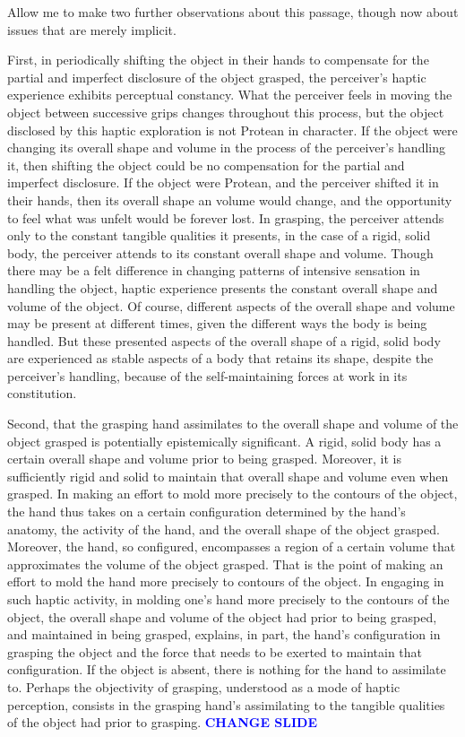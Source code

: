 \documentclass[12pt]{article}
\newcommand{\change}{\textcolor{blue}{\textbf{CHANGE SLIDE}}}
\begin{document}
Allow me to make two further observations about this passage, though now about issues that are merely implicit.

First, in periodically shifting the object in their hands to compensate for the partial and imperfect disclosure of the object grasped, the perceiver's haptic experience exhibits perceptual constancy. What the perceiver feels in moving the object between successive grips changes throughout this process, but the object disclosed by this haptic exploration is not Protean in character. If the object were changing its overall shape and volume in the process of the perceiver's handling it, then shifting the object could be no compensation for the partial and imperfect disclosure. If the object were Protean, and the perceiver shifted it in their hands, then its overall shape an volume would change, and the opportunity to feel what was unfelt would be forever lost. In grasping, the perceiver attends only to the constant tangible qualities it presents, in the case of a rigid, solid body, the perceiver attends to its constant overall shape and volume. Though there may be a felt difference in changing patterns of intensive sensation in handling the object, haptic experience presents the constant overall shape and volume of the object. Of course, different aspects of the overall shape and volume may be present at different times, given the different ways the body is being handled. But these presented aspects of the overall shape of a rigid, solid body are experienced as stable aspects of a body that retains its shape, despite the perceiver's handling, because of the self-maintaining forces at work in its constitution.

Second, that the grasping hand assimilates to the overall shape and volume of the object grasped is potentially epistemically significant. A rigid, solid body has a certain overall shape and volume prior to being grasped. Moreover, it is sufficiently rigid and solid to maintain that overall shape and volume even when grasped. In making an effort to mold more precisely to the contours of the object, the hand thus takes on a certain configuration determined by the hand's anatomy, the activity of the hand, and the overall shape of the object grasped. Moreover, the hand, so configured, encompasses a region of a certain volume that approximates the volume of the object grasped. That is the point of making an effort to mold the hand more precisely to contours of the object. In engaging in such haptic activity, in molding one's hand more precisely to the contours of the object, the overall shape and volume of the object had prior to being grasped, and maintained in being grasped, explains, in part, the hand's configuration in grasping the object and the force that needs to be exerted to maintain that configuration. If the object is absent, there is nothing for the hand to assimilate to. Perhaps the objectivity of grasping, understood as a mode of haptic perception, consists in the grasping hand's assimilating to the tangible qualities of the object had prior to grasping. \change
\end{document}
